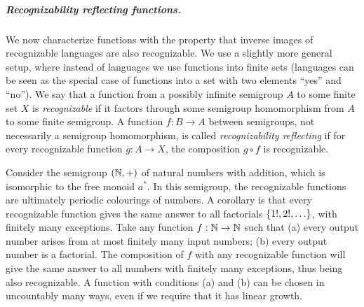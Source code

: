 \subparagraph{Recognizability reflecting functions.} We now characterize functions with the property that inverse images of recognizable languages are also recognizable. We use a slightly more general setup, where instead of languages we use functions into finite sets (languages can be seen as the special case of functions into a set with two elements ``yes'' and ``no''). We say that a function from a possibly infinite semigroup $A$ to some finite set $X$ is \emph{recognizable} if it factors through some semigroup homomorphism from $A$ to some finite semigroup. 
 A function $f : B \to A$ between semigroups, not necessarily a semigroup homomorphism, is called \emph{recognizability reflecting} if for every recognizable function $g : A \to X$, the composition $g \circ f$ is recognizable. 


\begin{example}[Factorials]
 Consider the semigroup $({\mathbb N}, +)$ of natural numbers with addition, which is isomorphic to the free monoid $a^*$. In this semigroup, the recognizable functions are ultimately periodic colourings of numbers. A corollary is that every recognizable function gives the same answer to all factorials $\{1!,2!,\ldots\}$, with finitely many exceptions. Take any function $f : {\mathbb N} \to {\mathbb N}$ such that (a) every output number arises from at most finitely many input numbers; (b) every output number is a factorial. The composition of $f$ with any recognizable function will give the same answer to all numbers with finitely many exceptions, thus being also recognizable. A function with conditions (a) and (b) can be chosen in uncountably many ways, even if we require that it has linear growth.
\end{example}

